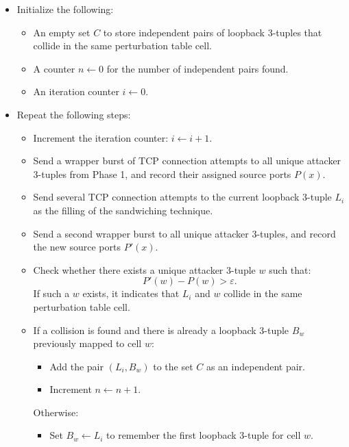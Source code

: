 \documentclass{report}
\begin{document}
\begin{itemize}
    \item Initialize the following:
    \begin{itemize}
        \item An empty set $C$ to store independent pairs of loopback 3-tuples that collide in the same perturbation table cell.
        \item A counter $n \leftarrow 0$ for the number of independent pairs found.
        \item An iteration counter $i \leftarrow 0$.
    \end{itemize}
    
    \item Repeat the following steps:
    \begin{itemize}
        \item Increment the iteration counter: $i \leftarrow i+1$.
        
        \item Send a wrapper burst of TCP connection attempts to all unique attacker 3-tuples from Phase 1, and record their assigned source ports $P(x)$.
        
        \item Send several TCP connection attempts to the current loopback 3-tuple $L_i$ as the filling of the sandwiching technique.
        
        \item Send a second wrapper burst to all unique attacker 3-tuples, and record the new source ports $P'(x)$.
        
        \item Check whether there exists a unique attacker 3-tuple $w$ such that:
        \[
            P'(w) - P(w) > \varepsilon.
        \]
        If such a $w$ exists, it indicates that $L_i$ and $w$ collide in the same perturbation table cell.
        
        \item If a collision is found and there is already a loopback 3-tuple $B_w$ previously mapped to cell $w$:
        \begin{itemize}
            \item Add the pair $(L_i, B_w)$ to the set $C$ as an independent pair.
            \item Increment $n \leftarrow n+1$.
        \end{itemize}
        Otherwise:
        \begin{itemize}
            \item Set $B_w \leftarrow L_i$ to remember the first loopback 3-tuple for cell $w$.
        \end{itemize}
    \end{itemize}
    

\end{itemize}
\end{document}
